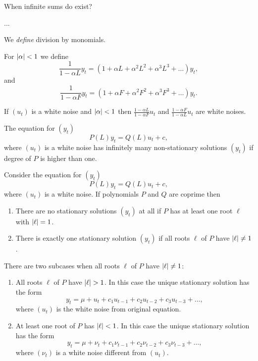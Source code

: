 \documentclass[12pt]{article} %
\begin{document}
When infinite sums do exist?


...



We \textit{define} division by monomials.



\begin{definition}
    For $\abs{\alpha} < 1$ we define
    \[
    \frac{1}{1 - \alpha L} y_t = (1 + \alpha L + \alpha^2 L^2 +\alpha^3 L^3 + \ldots )y_t,    
    \]
    and 
    \[
    \frac{1}{1 - \alpha F} y_t = (1 + \alpha F + \alpha^2 F^2 +\alpha^3 F^3 + \ldots )y_t.    
    \]
\end{definition}


\begin{theorem}
    If $(u_t)$ is a white noise and $\abs{\alpha} < 1$ then 
    $\frac{1- \alpha L}{1 - \alpha F} u_t$ and $\frac{1- \alpha F}{1 - \alpha L} u_t$ are white noises. 
\end{theorem}



\begin{theorem}
    The equation for $(y_t)$
    \[
    P(L) y_t = Q(L)u_t + c,    
    \]
    where $(u_t)$ is a white noise 
    has infinitely many non-stationary solutions $(y_t)$ if degree of $P$ is higher than one. 
\end{theorem}

\begin{theorem} \label{thm:solutionstructure}
Consider the equation for $(y_t)$
\[
    P(L) y_t = Q(L)u_t + c,
\]
where $(u_t)$ is a white noise.
If polynomials $P$ and $Q$ are coprime then 
\begin{enumerate}
    \item There are no stationary solutions $(y_t)$ at all if $P$ has at least one root $\ell$ with $\abs{\ell} = 1$.
    \item There is exactly one stationary solution $(y_t)$ if all roots $\ell$ of $P$ have $\abs{\ell} \neq 1$.
\end{enumerate}

There are two subcases when all roots $\ell$ of $P$ have $\abs{\ell} \neq 1$:
\begin{enumerate}
    \item All roots $\ell$ of $P$ have $\abs{\ell} > 1$.
    In this case the unique stationary solution has the form 
    \[
        y_t = \mu + u_t + c_1 u_{t-1} + c_2 u_{t-2} + c_3 u_{t-3} + \ldots,
    \]
    where $(u_t)$ is the white noise from original equation. 
    \item At least one root of $P$ has $\abs{\ell} <1$.
    In this case the unique stationary solution has the form 
    \[
        y_t = \mu + \nu_t + c_1 \nu_{t-1} + c_2 \nu_{t-2} + c_3 \nu_{t-3} + \ldots,
    \]
    where $(\nu_t)$ is a white noise different from $(u_t)$.

\end{enumerate}

\end{theorem}
\end{document}

